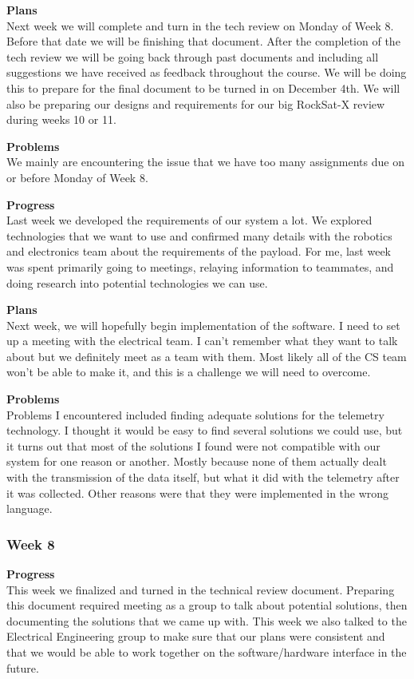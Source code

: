\textbf{Plans} \\
Next week we will complete and turn in the tech review on Monday of Week 8. Before that date we will be finishing that document. After the completion of the tech review we will be going back through past documents and including all suggestions we have received as feedback throughout the course. We will be doing this to prepare for the final document to be turned in on December 4th. We will also be preparing our designs and requirements for our big RockSat-X review during weeks 10 or 11.

\textbf{Problems} \\
We mainly are encountering the issue that we have too many assignments due on or before Monday of Week 8.

\textbf{Progress} \\
Last week we developed the requirements of our system a lot. We explored technologies that we want to use and confirmed many details with the robotics and electronics team about the requirements of the \gls{payload}. For me, last week was spent primarily going to meetings, relaying information to teammates, and doing research into potential technologies we can use.

\textbf{Plans} \\
Next week, we will hopefully begin implementation of the software. I need to set up a meeting with the electrical team. I can't remember what they want to talk about but we definitely meet as a team with them. Most likely all of the CS team won't be able to make it, and this is a challenge we will need to overcome.

\textbf{Problems} \\
Problems I encountered included finding adequate solutions for the telemetry technology. I thought it would be easy to find several solutions we could use, but it turns out that most of the solutions I found were not compatible with our system for one reason or another. Mostly because none of them actually dealt with the transmission of the data itself, but what it did with the telemetry after it was collected. Other reasons were that they were implemented in the wrong language.

\subsubsection{Week 8}
\textbf{Progress} \\
This week we finalized and turned in the technical review document. Preparing this document required meeting as a group to talk about potential solutions, then documenting the solutions that we came up with. This week we also talked to the Electrical Engineering group to make sure that our plans were consistent and that we would be able to work together on the software/hardware interface in the future.

